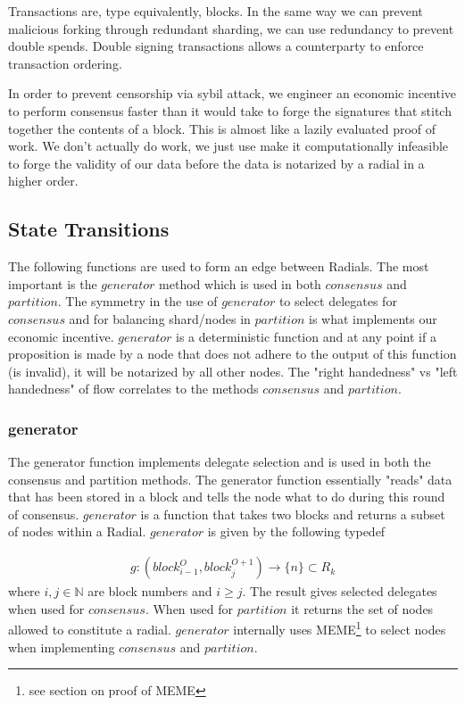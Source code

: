 \documentclass{article}
\begin{document}
Transactions are, type equivalently, blocks. In the same way we can prevent malicious forking through redundant sharding, we can use redundancy to prevent double spends. Double signing transactions allows a counterparty to enforce transaction ordering.

In order to prevent censorship via sybil attack, we engineer an economic incentive to perform consensus faster than it would take to forge the signatures that stitch together the contents of a block. This is almost like a lazily evaluated proof of work. We don't actually do work, we just use make it computationally infeasible to forge the validity of our data before the data is notarized by a radial in a higher order.

\subsection{State Transitions}
The following functions are used to form an edge between Radials. The most important is the $generator$ method which is used in both $consensus$ and $partition$. The symmetry in the use of $generator$ to select delegates for $consensus$ and for balancing shard/nodes in $partition$ is what implements our economic incentive. $generator$ is a deterministic function and at any point if a proposition is made by a node that does not adhere to the output of this function (is invalid), it will be notarized by all other nodes. The "right handedness" vs "left handedness" of flow correlates to the methods $consensus$ and $partition$.

\subsubsection{generator}
The generator function implements delegate selection and is used in both the consensus and partition methods. The generator function essentially "reads" data that has been stored in a block and tells the node what to do during this round of consensus. $generator$ is a function that takes two blocks and returns a subset of nodes within a Radial. $generator$ is given by the following typedef

\begin{align*}
g: (block^{O}_{i-1}, block^{O+1}_{j}) \rightarrow \{ n\} \subset R_k
\end{align*}
where $i, j \in \mathbb{N}$ are block numbers and $i\geq j$. The result gives selected delegates when used for $consensus$. When used for $partition$ it returns the set of nodes allowed to constitute a radial. $generator$ internally uses MEME\footnote{see section on proof of MEME} to select nodes when implementing $consensus$ and $partition$.
\end{document}
